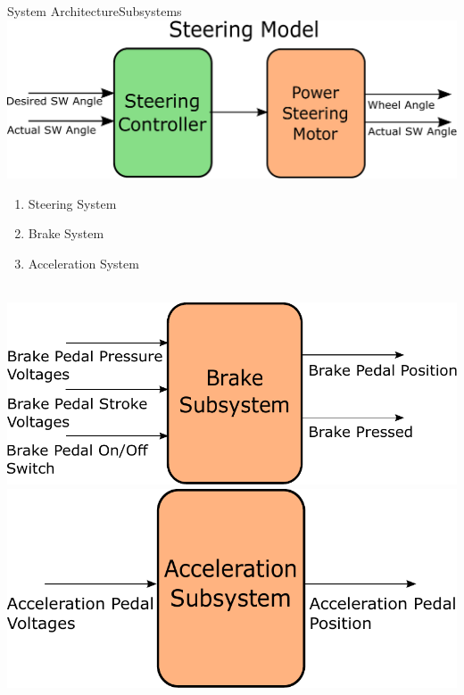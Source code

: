 \documentclass{beamer}
\begin{document}
\begin{frame}{System Architecture}{Subsystems}
	\centering \includegraphics[width=.45\linewidth]{figs/inkscape/steeringModelArchitecture}\quad%
	\centering \begin{minipage}[b][0.4\textheight][c]{.45\linewidth} \begin{enumerate} \item Steering System 			\item Brake System \item Acceleration System \end{enumerate} \end{minipage}\\[1em]
	\centering \includegraphics[width=.45\linewidth]{figs/inkscape/brakeModelArchitecture}\quad%
	\centering \includegraphics[width=.45\linewidth]{figs/inkscape/accelerationModelArchitecture}
\end{frame}
\end{document}
